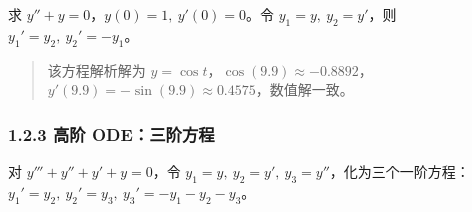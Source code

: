 求 \(y''+y=0\)，\(y(0)=1,\ y'(0)=0\)。令 \(y_1=y,\ y_2=y'\)，则
\(y_1'=y_2,\ y_2'=-y_1\)。

\begin{Shaded}
\begin{Highlighting}[]
\OperatorTok{=}
    \NormalTok{ [y2, }\OperatorTok{{-}}\NormalTok{y1]}

\OperatorTok{=}\NormalTok{ odeint(second\_order, [}\NormalTok{, }\NormalTok{], t)}
\NormalTok{(}\NormalTok{, y[}\OperatorTok{{-}}\NormalTok{,}\NormalTok{], }\NormalTok{, y[}\OperatorTok{{-}}\NormalTok{,}\NormalTok{])}
\end{Highlighting}
\end{Shaded}

\begin{Shaded}
\begin{Highlighting}[]
\end{Highlighting}
\end{Shaded}

\begin{quote}
该方程解析解为
\(y=\cos t\)，\(\cos(9.9)\approx -0.8892\)，\(y'(9.9)=-\sin(9.9)\approx 0.4575\)，数值解一致。
\end{quote}

\subsubsection{1.2.3 高阶
ODE：三阶方程}\label{ux9ad8ux9636-odeux4e09ux9636ux65b9ux7a0b}

对 \(y'''+y''+y'+y=0\)，令
\(y_1=y,\ y_2=y',\ y_3=y''\)，化为三个一阶方程：\(y_1'=y_2,\ y_2'=y_3,\ y_3'=-y_1-y_2-y_3\)。

\begin{Shaded}
\begin{Highlighting}[]
\OperatorTok{=}
    \NormalTok{ [y2, y3, }\OperatorTok{{-}}\OperatorTok{{-}}\OperatorTok{{-}}\NormalTok{ y3]}

\OperatorTok{=}\NormalTok{ odeint(third\_order, [}\NormalTok{, }\NormalTok{, }\NormalTok{], t)}
\NormalTok{(}\SpecialCharTok{\{}\NormalTok{y[}\OperatorTok{{-}}\NormalTok{,}\NormalTok{]}\SpecialCharTok{\{}\NormalTok{y[}\OperatorTok{{-}}\NormalTok{,}\NormalTok{]}\SpecialCharTok{\{}\NormalTok{y[}\OperatorTok{{-}}\NormalTok{,}\NormalTok{]}\NormalTok{)}
\end{Highlighting}
\end{Shaded}

